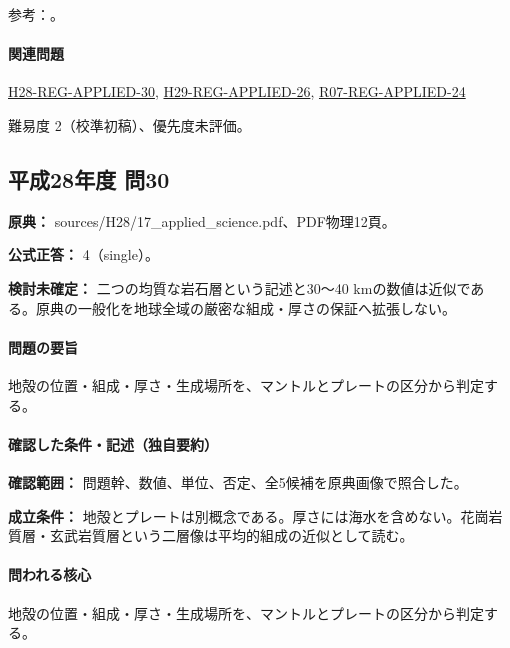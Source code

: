 \par 参考：\cite{usgs_interior_structure,usgs_plate_boundaries,umich_crust_teaching}。

\paragraph{関連問題} \hyperref[q:h28-reg-applied-30]{H28-REG-APPLIED-30}, \hyperref[q:h29-reg-applied-26]{H29-REG-APPLIED-26}, \hyperref[q:r07-reg-applied-24]{R07-REG-APPLIED-24}

\par 難易度 2（校準初稿）、優先度未評価。

\subsection{平成28年度 問30}
\label{q:h28-reg-applied-30}

\noindent\textbf{原典：} sources/H28/17\_applied\_science.pdf、PDF物理12頁。

\textbf{公式正答：} 4（single）。

\par\textbf{検討未確定：} 二つの均質な岩石層という記述と30〜40 kmの数値は近似である。原典の一般化を地球全域の厳密な組成・厚さの保証へ拡張しない。

\paragraph{問題の要旨} 地殻の位置・組成・厚さ・生成場所を、マントルとプレートの区分から判定する。

\paragraph{確認した条件・記述（独自要約）}\mbox{}\par

\noindent\textbf{確認範囲：} 問題幹、数値、単位、否定、全5候補を原典画像で照合した。\par

\noindent\textbf{成立条件：} 地殻とプレートは別概念である。厚さには海水を含めない。花崗岩質層・玄武岩質層という二層像は平均的組成の近似として読む。\par

\paragraph{問われる核心} 地殻の位置・組成・厚さ・生成場所を、マントルとプレートの区分から判定する。

